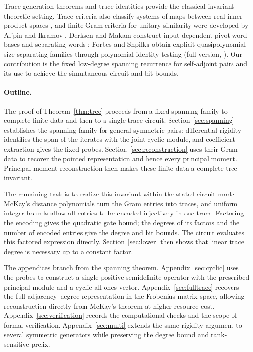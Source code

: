 \documentclass[11pt,letterpaper]{article}
\theoremstyle{definition}\newtheorem{definition}[theorem]{Definition}
\theoremstyle{remark}\newtheorem{remark}[theorem]{Remark}
\begin{document}
Trace-generation theorems \cite{Procesi} and trace identities \cite{Razmyslov} provide the classical invariant-theoretic setting. Trace criteria also classify systems of maps between real inner-product spaces \cite[Corollary 1]{FHS}, and finite Gram criteria for unitary similarity were developed by Al'pin and Ikramov \cite[Proposition 10 and Theorem 5]{AlpinIkramov}. Derksen and Makam construct input-dependent pivot-word bases and separating words \cite[Algorithm 4.8 and Section 5]{DM}; Forbes and Shpilka obtain explicit quasipolynomial-size separating families through polynomial identity testing (full version, \cite[Theorem 1.13]{FS}). Our contribution is the fixed low-degree spanning recurrence for self-adjoint pairs and its use to achieve the simultaneous circuit and bit bounds.

\paragraph{Outline.}
The proof of Theorem~\ref{thm:tree} proceeds from a fixed spanning family to complete finite data and then to a single trace circuit. Section~\ref{sec:spanning} establishes the spanning family for general symmetric pairs: differential rigidity identifies the span of the iterates with the joint cyclic module, and coefficient extraction gives the fixed probes. Section~\ref{sec:reconstruction} uses their Gram data to recover the pointed representation and hence every principal moment. Principal-moment reconstruction then makes these finite data a complete tree invariant.

The remaining task is to realize this invariant within the stated circuit model. McKay's distance polynomials turn the Gram entries into traces, and uniform integer bounds allow all entries to be encoded injectively in one trace. Factoring the encoding gives the quadratic gate bound; the degrees of its factors and the number of encoded entries give the degree and bit bounds. The circuit evaluates this factored expression directly. Section~\ref{sec:lower} then shows that linear trace degree is necessary up to a constant factor.

The appendices branch from the spanning theorem. Appendix~\ref{sec:cyclic} uses the probes to construct a single positive semidefinite operator with the prescribed principal module and a cyclic all-ones vector. Appendix~\ref{sec:fulltrace} recovers the full adjacency--degree representation in the Frobenius matrix space, allowing reconstruction directly from McKay's theorem at higher resource cost. Appendix~\ref{sec:verification} records the computational checks and the scope of formal verification. Appendix~\ref{sec:multi} extends the same rigidity argument to several symmetric generators while preserving the degree bound and rank-sensitive prefix.
\end{document}
